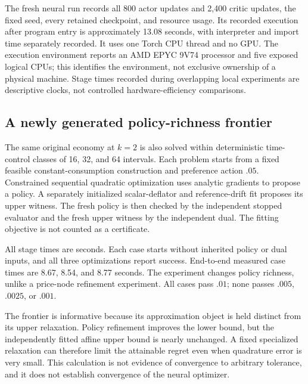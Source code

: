 The fresh neural run records all 800 actor updates and 2,400 critic updates, the fixed seed, every retained checkpoint, and resource usage. Its recorded execution after program entry is approximately 13.08 seconds, with interpreter and import time separately recorded. It uses one Torch CPU thread and no GPU. The execution environment reports an AMD EPYC 9V74 processor and five exposed logical CPUs; this identifies the environment, not exclusive ownership of a physical machine. Stage times recorded during overlapping local experiments are descriptive clocks, not controlled hardware-efficiency comparisons.

\subsection{A newly generated policy-richness frontier}
The same original economy at $k=2$ is also solved within deterministic time-control classes of 16, 32, and 64 intervals. Each problem starts from a fixed feasible constant-consumption construction and preference action $.05$. Constrained sequential quadratic optimization uses analytic gradients to propose a policy. A separately initialized scalar-deflator and reference-drift fit proposes its upper witness. The fresh policy is then checked by the independent stopped evaluator and the fresh upper witness by the independent dual. The fitting objective is not counted as a certificate.

\begin{table}[t]\centering\small
\caption{Fresh generation and independent verification as policy richness increases}\label{tab:frontier}

\par\smallskip\footnotesize All stage times are seconds. Each case starts without inherited policy or dual inputs, and all three optimizations report success. End-to-end measured case times are 8.67, 8.54, and 8.77 seconds. The experiment changes policy richness, unlike a price-node refinement experiment. All cases pass $.01$; none passes $.005$, $.0025$, or $.001$.
\end{table}

The frontier is informative because its approximation object is held distinct from its upper relaxation. Policy refinement improves the lower bound, but the independently fitted affine upper bound is nearly unchanged. A fixed specialized relaxation can therefore limit the attainable regret even when quadrature error is very small. This calculation is not evidence of convergence to arbitrary tolerance, and it does not establish convergence of the neural optimizer.

